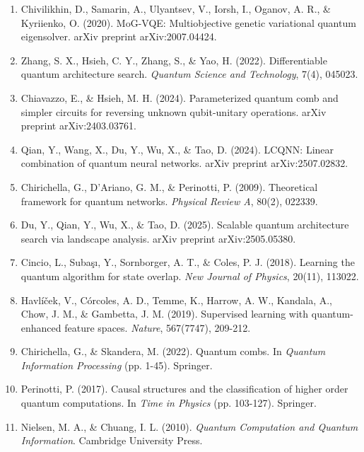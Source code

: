 \documentclass[12pt,a4paper]{article}
\begin{document}
\begin{enumerate}
\item Chivilikhin, D., Samarin, A., Ulyantsev, V., Iorsh, I., Oganov, A. R., \& Kyriienko, O. (2020). MoG-VQE: Multiobjective genetic variational quantum eigensolver. arXiv preprint arXiv:2007.04424.

\item Zhang, S. X., Hsieh, C. Y., Zhang, S., \& Yao, H. (2022). Differentiable quantum architecture search. \textit{Quantum Science and Technology}, 7(4), 045023.

\item Chiavazzo, E., \& Hsieh, M. H. (2024). Parameterized quantum comb and simpler circuits for reversing unknown qubit-unitary operations. arXiv preprint arXiv:2403.03761.

\item Qian, Y., Wang, X., Du, Y., Wu, X., \& Tao, D. (2024). LCQNN: Linear combination of quantum neural networks. arXiv preprint arXiv:2507.02832.

\item Chirichella, G., D'Ariano, G. M., \& Perinotti, P. (2009). Theoretical framework for quantum networks. \textit{Physical Review A}, 80(2), 022339.

\item Du, Y., Qian, Y., Wu, X., \& Tao, D. (2025). Scalable quantum architecture search via landscape analysis. arXiv preprint arXiv:2505.05380.

\item Cincio, L., Subaşı, Y., Sornborger, A. T., \& Coles, P. J. (2018). Learning the quantum algorithm for state overlap. \textit{New Journal of Physics}, 20(11), 113022.

\item Havlíček, V., Córcoles, A. D., Temme, K., Harrow, A. W., Kandala, A., Chow, J. M., \& Gambetta, J. M. (2019). Supervised learning with quantum-enhanced feature spaces. \textit{Nature}, 567(7747), 209-212.

\item Chirichella, G., \& Skandera, M. (2022). Quantum combs. In \textit{Quantum Information Processing} (pp. 1-45). Springer.

\item Perinotti, P. (2017). Causal structures and the classification of higher order quantum computations. In \textit{Time in Physics} (pp. 103-127). Springer.

\item Nielsen, M. A., \& Chuang, I. L. (2010). \textit{Quantum Computation and Quantum Information}. Cambridge University Press.
\end{enumerate}
\end{document}
